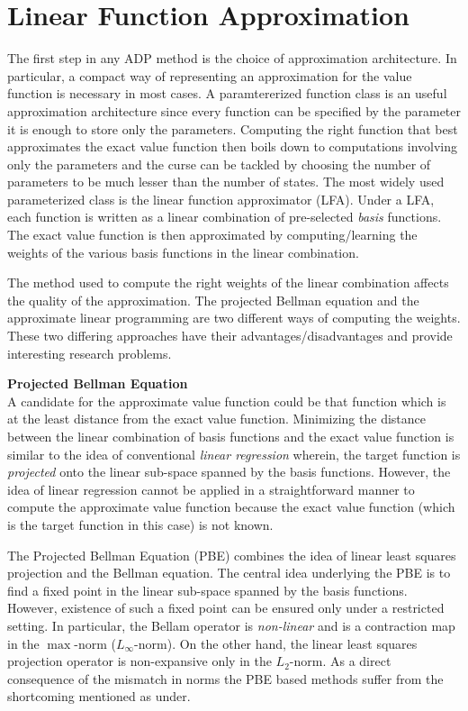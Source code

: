 \section{Linear Function Approximation}
The first step in any ADP method is the choice of approximation architecture. In particular, a compact way of representing an approximation for the value function is necessary in most cases. A paramtererized function class is an useful approximation architecture since every function can be specified by the parameter it is enough to store only the parameters. Computing the right function that best approximates the exact value function then boils down to computations involving only the parameters and the curse can be tackled by choosing the number of parameters to be much lesser than the number of states. The most widely used parameterized class is the linear function approximator (LFA). Under a LFA, each function is written as a linear combination of pre-selected \emph{basis} functions. The exact value function is then approximated by computing/learning the weights of the various basis functions in the linear combination.\par
The method used to compute the right weights of the linear combination affects the quality of the approximation. The projected Bellman equation and the approximate linear programming are two different ways of computing the weights. These two differing approaches have their advantages/disadvantages and provide interesting research problems.\par
\textbf{Projected Bellman Equation}\\
A candidate for the approximate value function could be that function which is at the least distance from the exact value function. Minimizing the distance between the linear combination of basis functions and the exact value function is similar to the idea of conventional \emph{linear regression} wherein, the target function is \emph{projected} onto the linear sub-space spanned by the basis functions. However, the idea of linear regression cannot be applied in a straightforward manner to compute the approximate value function because the exact value function (which is the target function in this case) is not known.\par
The Projected Bellman Equation (PBE) combines the idea of linear least squares projection and the Bellman equation. The central idea underlying the PBE is to find a fixed point in the linear sub-space spanned by the basis functions. However, existence of such a fixed point can be ensured only under a restricted setting. In particular, the Bellam operator is \emph{non-linear} and is a contraction map in the $\max$-norm ($L_\infty$-norm). On the other hand, the linear least squares projection operator is non-expansive only in the $L_2$-norm. As a direct consequence of the mismatch in norms the PBE based methods suffer from the shortcoming mentioned as under.
